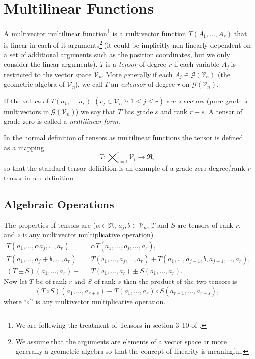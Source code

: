 \documentclass[12pt]{report}
\newcommand{\lp}{\left (}
\newcommand{\rp}{\right )}
\newcommand{\f}[2]{{#1}\lp {#2} \rp}
\newcommand{\be}{\begin{equation}}
\newcommand{\ee}{\end{equation}}
\begin{document}
\section{Multilinear Functions}\label{MLTrans}
A multivector multilinear function\footnote{We are following the treatment of Tensors in section 3--10 of \cite{Hestenes}.} is a
multivector function $\f{T}{A_{1},\dots,A_{r}}$ that is linear in each of it arguments\footnote{We assume that the arguments
are elements of a vector space or more generally a geometric algebra so that the concept of linearity is meaningful.}
(it could be implicitly non-linearly dependent
on a set of additional arguments such as the position coordinates, but we only consider the linear arguments). $T$ is a \emph{tensor}
of degree $r$ if each variable $A_{j}$ is restricted to the vector space $\mathcal{V}_{n}$.  More generally if each
$A_{j}\in\f{\mathcal{G}}{\mathcal{V}_{n}}$ (the geometric algebra of $\mathcal{V}_{n}$), we call $T$ an \emph{extensor} of
degree-$r$ on $\f{\mathcal{G}}{\mathcal{V}_{n}}$.

If the values of $\f{T}{a_{1},\dots,a_{r}}$ $\lp a_{j}\in\mathcal{V}_{n}\;\forall\; 1\le j \le r \rp$ are $s$-vectors
(pure grade $s$ multivectors in
$\f{\mathcal{G}}{\mathcal{V}_{n}}$) we say that $T$ has grade $s$ and rank $r+s$.  A tensor of grade zero is called a
\emph{multilinear form}.

In the normal definition of tensors as multilinear functions the tensor is defined as a mapping
$$T:\bigtimes_{i=1}^{r}\mathcal{V}_{i}\rightarrow\Re,$$ so that the standard tensor definition is an example of a grade zero
degree/rank $r$ tensor in our definition.

\subsection{Algebraic Operations}
The properties of tensors are ($\alpha\in\Re$, $a_{j},b\in\mathcal{V}_{n}$, $T$ and $S$ are tensors of rank $r$,
and $\circ$ is any multivector multiplicative operation)
\begin{align}
    \f{T}{a_{1},\dots,\alpha a_{j},\dots,a_{r}} =& \alpha\f{T}{a_{1},\dots,a_{j},\dots,a_{r}}, \\
    \f{T}{a_{1},\dots,a_{j}+b,\dots,a_{r}} =& \f{T}{a_{1},\dots,a_{j},\dots,a_{r}}+ \f{T}{a_{1},\dots,a_{j-1},b,a_{j+1},\dots,a_{r}}, \\
    \f{\lp T\pm S\rp}{a_{1},\dots,a_{r}} \equiv& \f{T}{a_{1},\dots,a_{r}}\pm\f{S}{a_{1},\dots,a_{r}}.
\end{align}
Now let $T$ be of rank $r$ and $S$ of rank $s$ then the product of the two tensors is
\be
    \f{\lp T\circ S\rp}{a_{1},\dots,a_{r+s}} \equiv \f{T}{a_{1},\dots,a_{r}}\circ\f{S}{a_{r+1},\dots,a_{r+s}},
\ee
where ``$\circ$'' is any multivector multiplicative operation.
\end{document}
